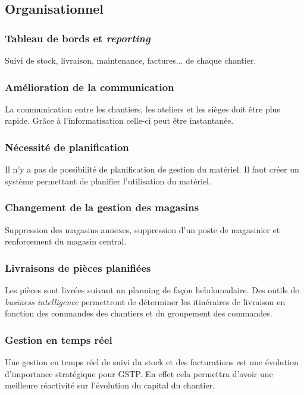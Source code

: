 \subsection{Organisationnel}

\subsubsection{Tableau de bords et {\sl reporting}}

Suivi de stock, livraison, maintenance, factures... de chaque chantier.

\subsubsection{Amélioration de la communication}

La communication entre les chantiers, les ateliers et les sièges doit être
plus rapide. Grâce à l’informatisation celle-ci peut être instantanée.

\subsubsection{Nécessité de planification}

Il n’y a pas de possibilité de planification de gestion du matériel. 
Il faut créer un système permettant de planifier l’utilisation du matériel.

\subsubsection{Changement de la gestion des magasins}

Suppression des magasins annexes, suppression d’un poste de magasinier et
renforcement du magasin central.

\subsubsection{Livraisons de pièces planifiées}

Les pièces sont livrées suivant un planning de façon hebdomadaire. 
Des outils de {\sl business intelligence} permettront de déterminer les
itinéraires de livraison en fonction des commandes des chantiers et du
groupement des commandes.

\subsubsection{Gestion en temps réel}
Une gestion en temps réel de suivi du stock et des facturations
est une évolution 
d’importance stratégique pour GSTP. En effet cela permettra 
d’avoir une meilleure
 réactivité sur l'évolution du capital du chantier.

